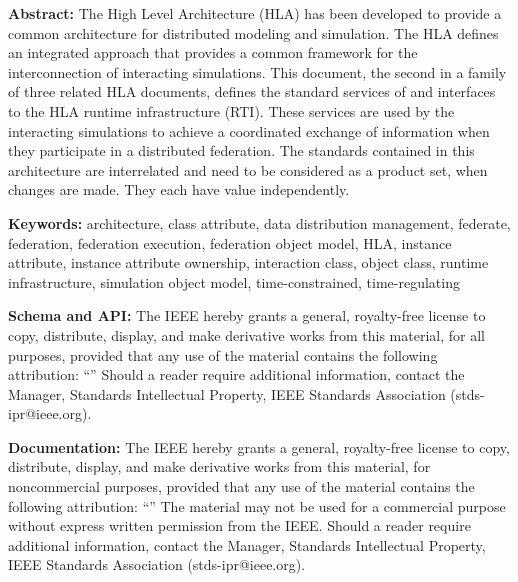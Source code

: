 \thispagestyle{empty}
\begingroup
\sffamily
\fontsize{9.1}{10.8}\selectfont
\vspace*{0.15in}

\textbf{Abstract:} The High Level Architecture (HLA) has been developed to provide a common architecture for distributed modeling and simulation. The HLA defines an integrated approach that provides a common framework for the interconnection of interacting simulations. This document, the second in a family of three related HLA documents, defines the standard services of and interfaces to the HLA runtime infrastructure (RTI). These services are used by the interacting simulations to achieve a coordinated exchange of information when they participate in a distributed federation. The standards contained in this architecture are interrelated and need to be considered as a product set, when changes are made. They each have value independently.

\textbf{Keywords:} architecture, class attribute, data distribution management, federate, federation, federation execution, federation object model, HLA, instance attribute, instance attribute ownership, interaction class, object class, runtime infrastructure, simulation object model, time-constrained, time-regulating

\vspace{0.25in}
\textbf{Schema and API:} The IEEE hereby grants a general, royalty-free license to copy, distribute, display, and make derivative works from this material, for all purposes, provided that any use of the material contains the following attribution: ``\sourceattribution'' Should a reader require additional information, contact the Manager, Standards Intellectual Property, IEEE Standards Association (stds-ipr@ieee.org).

\textbf{Documentation:} The IEEE hereby grants a general, royalty-free license to copy, distribute, display, and make derivative works from this material, for noncommercial purposes, provided that any use of the material contains the following attribution: ``\sourceattribution'' The material may not be used for a commercial purpose without express written permission from the IEEE. Should a reader require additional information, contact the Manager, Standards Intellectual Property, IEEE Standards Association (stds-ipr@ieee.org).

